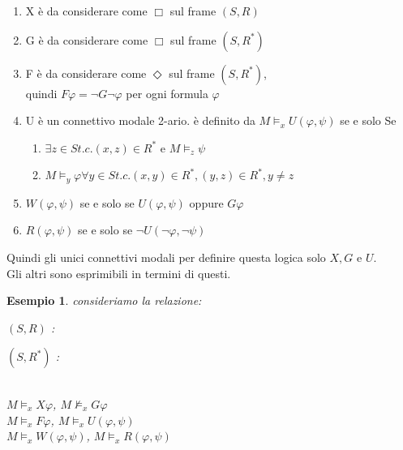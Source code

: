 \documentclass[a4paper,12pt]{article}
\theoremstyle{def}
\theoremstyle{prop}
\theoremstyle{esempio}
\newtheorem*{example}{Esempio}
\theoremstyle{dimostrazione}
\theoremstyle{teo}
\theoremstyle{osservazione}
\begin{document}
\begin{enumerate}
	\item X è da considerare come \(\Box\) sul frame \((S,R)\)
	\item G è da considerare come \(\Box\) sul frame \((S,R^*)\)
	\item F è da considerare come \(\Diamond\) sul frame \((S,R^*)\),\\
			quindi \(F \varphi = \neg G \neg \varphi\) per ogni formula \(\varphi\)
	\item U è un connettivo modale 2-ario. è definito da
			\(M \vDash_x U(\varphi, \psi)\) se e solo Se
			\begin{enumerate}
				\item \(\exists z \in S t.c. (x,z) \in R^*\) e \(M \vDash_z \psi\)
				\item \(M \vDash_y \varphi \forall y \in S t.c. (x,y) \in R^*, (y,z) \in R^*, y \neq z\)
			\end{enumerate}
	\item \(W(\varphi, \psi)\) se e solo se \(U(\varphi, \psi)\) oppure \(G \varphi\)
	\item \(R(\varphi, \psi)\) se e solo se \(\neg U(\neg \varphi, \neg \psi)\)
\end{enumerate}
Quindi gli unici connettivi modali per definire questa logica solo \(X, G\) e \(U\).\\
Gli altri sono esprimibili in termini di questi.
\begin{example}
consideriamo la relazione:
	\begin{center}
		\((S,R)\) :
		\((S,R^*)\) :
		\\

		\(M \vDash_x X \varphi\), \(M \nvDash_x G \varphi\)\\
		\(M \vDash_x F \varphi\), \(M \vDash_x U(\varphi, \psi)\)\\
		\(M \vDash_x W(\varphi, \psi)\), \(M \vDash_x R(\varphi, \psi)\)
	\end{center}
\end{example}
\end{document}
